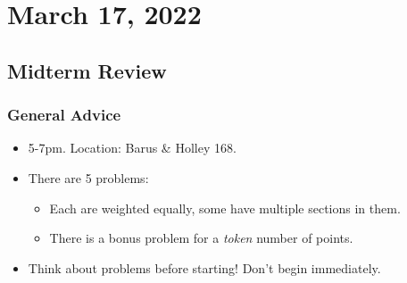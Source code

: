 \section{March 17, 2022}
\subsection{Midterm Review}
\subsubsection*{General Advice}
\begin{itemize}
    \item 5-7pm. Location: Barus \& Holley 168.
    \item There are 5 problems:
          \begin{itemize}
              \item Each are weighted equally, some have multiple sections in them.
              \item There is a bonus problem for a \emph{token} number of points.
          \end{itemize}
    \item Think about problems before starting! Don't begin immediately.
\end{itemize}


